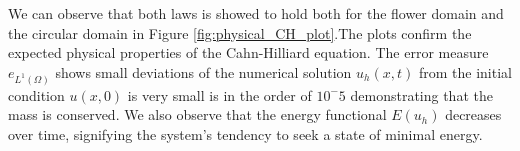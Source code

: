 We can observe that both laws is showed to hold both for the flower domain and the circular domain in Figure \ref{fig:physical_CH_plot}.The plots confirm the expected physical properties of the Cahn-Hilliard equation. The error measure
$e_{L^{1}(\Omega)}$ shows small deviations of the numerical solution $u_h(x, t)$ from the initial condition $u(x, 0)$ is very small is in the order of $10^-5$ demonstrating that the mass is conserved. We also observe that the energy functional
$E(u_h)$ decreases over time, signifying the system's tendency to seek a state of minimal energy.




\begin{figure}[h!]
    \centering
    \hfill
    \hfill
    \vspace{10pt}
\end{figure}

